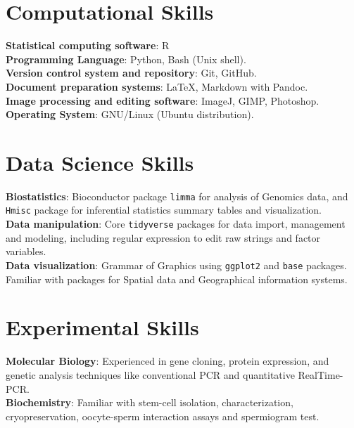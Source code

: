 \documentclass[margin,line]{res}
\begin{document}
\begin{resume}
\section{\sc Computational Skills}
{\bf Statistical computing software}: R\\ %
{\bf Programming Language}: Python, Bash (Unix shell).\\%
{\bf Version control system and repository}: Git, GitHub.\\ %
{\bf Document preparation systems}: LaTeX, Markdown with Pandoc.\\ 
{\bf Image processing and editing software}: ImageJ, GIMP, Photoshop.\\
{\bf Operating System}: GNU/Linux (Ubuntu distribution).\\ %

\section{\sc Data Science Skills}%
{\bf Biostatistics}: Bioconductor package \texttt{limma} for analysis of Genomics data, and \texttt{Hmisc} package for inferential statistics summary tables and visualization.\\ 
{\bf Data manipulation}: Core \texttt{tidyverse} packages for data import, management and modeling, including regular expression to edit raw strings and factor variables.\\
{\bf Data visualization}: Grammar of Graphics using \texttt{ggplot2} and \texttt{base} packages. Familiar with packages for Spatial data and Geographical information systems.\\ %


\section{\sc Experimental Skills}
{\bf Molecular Biology}: Experienced in gene cloning, protein expression, and genetic analysis techniques like conventional PCR and quantitative RealTime-PCR.\\
{\bf Biochemistry}: Familiar with stem-cell isolation, characterization, cryopreservation, oocyte-sperm interaction assays and spermiogram test.\\ %


\end{resume}
\end{document}
